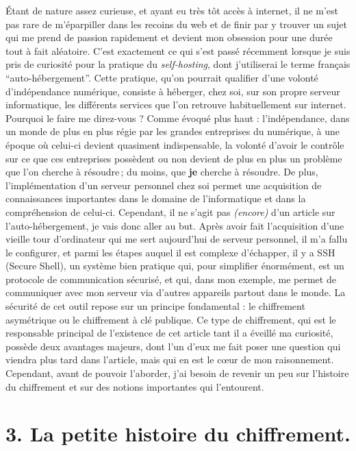 \documentclass[
  paper=a4,
  ,captions=tableheading
]{scrartcl}
\begin{document}
Étant de nature assez curieuse, et ayant eu très tôt accès à internet,
il ne m'est pas rare de m'éparpiller dans les recoins du web et de finir
par y trouver un sujet qui me prend de passion rapidement et devient mon
obsession pour une durée tout à fait aléatoire. C'est exactement ce qui
s'est passé récemment lorsque je suis pris de curiosité pour la pratique
du \emph{self-hosting}, dont j'utiliserai le terme français
``auto-hébergement''. Cette pratique, qu'on pourrait qualifier d'une
volonté d'indépendance numérique, consiste à héberger, chez soi, sur son
propre serveur informatique, les différents services que l'on retrouve
habituellement sur internet. Pourquoi le faire me direz-vous ? Comme
évoqué plus haut : l'indépendance, dans un monde de plus en plus régie
par les grandes entreprises du numérique, à une époque où celui-ci
devient quasiment indispensable, la volonté d'avoir le contrôle sur ce
que ces entreprises possèdent ou non devient de plus en plus un problème
que l'on cherche à résoudre\,; du moins, que \textbf{je} cherche à
résoudre. De plus, l'implémentation d'un serveur personnel chez soi
permet une acquisition de connaissances importantes dans le domaine de
l'informatique et dans la compréhension de celui-ci. Cependant, il ne
s'agit pas \emph{(encore)} d'un article sur l'auto-hébergement, je vais
donc aller au but. Après avoir fait l'acquisition d'une vieille tour
d'ordinateur qui me sert aujourd'hui de serveur personnel, il m'a fallu
le configurer, et parmi les étapes auquel il est complexe d'échapper, il
y a SSH (Secure Shell), un système bien pratique qui, pour simplifier
énormément, est un protocole de communication sécurisé, et qui, dans mon
exemple, me permet de communiquer avec mon serveur via d'autres
appareils partout dans le monde. La sécurité de cet outil repose sur un
principe fondamental : le chiffrement asymétrique ou le chiffrement à
clé publique. Ce type de chiffrement, qui est le responsable principal
de l'existence de cet article tant il a éveillé ma curiosité, possède
deux avantages majeurs, dont l'un d'eux me fait poser une question qui
viendra plus tard dans l'article, mais qui en est le cœur de mon
raisonnement. Cependant, avant de pouvoir l'aborder, j'ai besoin de
revenir un peu sur l'histoire du chiffrement et sur des notions
importantes qui l'entourent.

\section{3. La petite histoire du
chiffrement.}\label{la-petite-histoire-du-chiffrement.}
\end{document}
